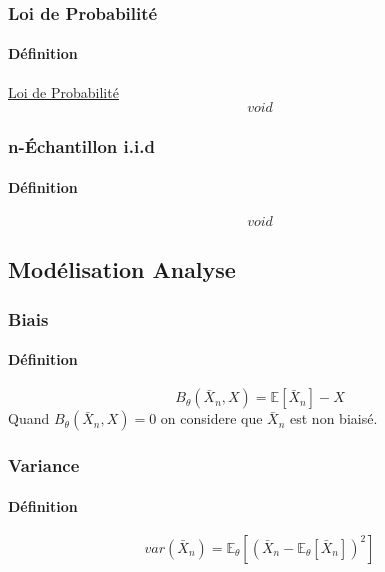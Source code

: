 \documentclass{article}
\begin{document}
\subsubsection{Loi de Probabilité}
\paragraph{Définition} \href{https://fr.wikipedia.org/wiki/Loi_de_probabilit%C3%A9}{Loi de Probabilité}
\begin{equation}
    \boxed{
        void
    }
\end{equation}

\subsubsection{n-Échantillon i.i.d}
\paragraph{Définition}
\begin{equation}
    \boxed{
        void
    }
\end{equation}

\subsection{Modélisation Analyse}
\subsubsection{Biais}
\paragraph{Définition}
\begin{equation}
    \boxed{
        B_{\theta}(\bar{X}_{n}, X) = \mathbb{E}[\bar{X}_{n}] - X
    }
\end{equation}
Quand $B_{\theta}(\bar{X}_{n}, X) = 0$ on considere que $\bar{X}_{n}$ est non biaisé.

\subsubsection{Variance}
\paragraph{Définition}
\begin{equation}
    \boxed{
        var(\bar{X}_{n}) = \mathbb{E}_{\theta}[(\bar{X}_{n} - \mathbb{E}_{\theta}[\bar{X}_{n}])^{2}]
    }
\end{equation}
\end{document}
